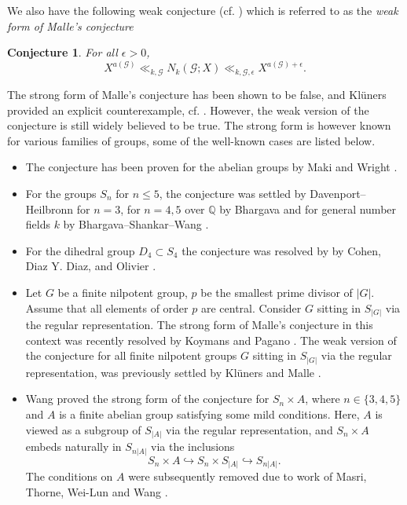 \documentclass[11pt]{amsart}
\newtheorem{conjecture}[theorem]{Conjecture}
\newcommand{\Q}{\mathbb{Q}}
\numberwithin{equation}{section}
\begin{document}
We also have the following weak conjecture (cf. \cite[p.316]{malle2002distribution}) which is referred to as the \emph{weak form of Malle's conjecture}
\begin{conjecture}\label{weak malle's}
     For all $\epsilon>0$,
    \[X^{a(\mathcal{G})}\ll_{k, \mathcal{G}} N_{k}(\mathcal{G};X)\ll_{k, \mathcal{G}, \epsilon}X^{a(\mathcal{G})+\epsilon}.\]
\end{conjecture}
The strong form of Malle's conjecture has been shown to be false, and Kl\"uners provided an explicit counterexample, cf. \cite{kluners2005counter}. However, the weak version of the conjecture is still widely believed to be true. The strong form is however known for various families of groups, some of the well-known cases are listed below.
\begin{itemize}
    \item The conjecture has been proven for the abelian groups by Maki \cite{maki1985density} and Wright \cite{wright1989distribution}.
    \item For the groups $S_n$ for $n\leq 5$, the conjecture was settled by Davenport--Heilbronn \cite{davenport1971density} for $n=3$, for $n=4,5$ over $\Q$ by Bhargava \cite{bhargava2005density, bhargava2010density} and for general number fields $k$ by Bhargava--Shankar--Wang \cite{bhargava2015geometryofnumbers}.
    \item For the dihedral group $D_4\subset S_4$ the conjecture was resolved by by Cohen, Diaz Y. Diaz, and Olivier \cite{cohen2002enumerating}.
    \item Let $G$ be a finite nilpotent group, $p$ be the smallest prime divisor of $|G|$. Assume that all elements of order $p$ are central. Consider $G$ sitting in $S_{|G|}$ via the regular representation. The strong form of Malle's conjecture in this context was recently resolved by Koymans and Pagano \cite{koymanspagano2023}. The weak version of the conjecture for all finite nilpotent groups $G$ sitting in $S_{|G|}$ via the regular representation, was previously settled by Kl\"uners and Malle \cite{klunersmalle}.
    \item Wang \cite{Wang2020} proved the strong form of the conjecture for $S_n\times A$, where $n\in \{3, 4,5\}$ and $A$ is a finite abelian group satisfying some mild conditions. Here, $A$ is viewed as a subgroup of $S_{|A|}$ via the regular representation, and $S_n\times A$ embeds naturally in $S_{n|A|}$ via the inclusions 
    \[S_n\times A\hookrightarrow S_n\times S_{|A|}\hookrightarrow S_{n|A|}. \] The conditions on $A$ were subsequently removed due to work of Masri, Thorne, Wei-Lun and Wang \cite{masri2020malle}.
\end{itemize}
\end{document}
